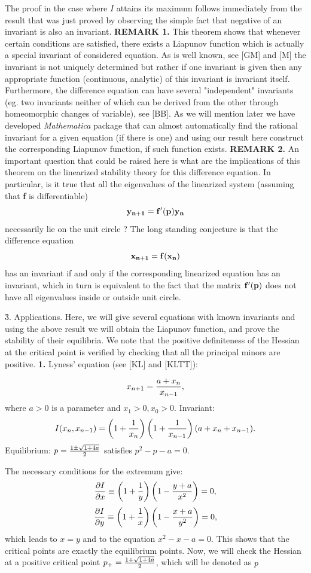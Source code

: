 The proof in the case where $I$ attains its maximum follows immediately from
the result that was just proved by observing the simple fact that negative of
an invariant is also an invariant.
\bigskip
{\bf REMARK 1.} This theorem shows that whenever certain
conditions are satisfied, there exists a Liapunov function which
is actually a special invariant of considered equation. As is well
known, see [GM] and [M] the invariant is not uniquely determined
but rather if one invariant is given then any appropriate function
(continuous, analytic) of this invariant is invariant itself.
Furthermore, the difference equation can have several
"independent" invariants (eg. two invariants neither of which can
be derived from the other through homeomorphic changes of
variable), see [BB]. As we will mention later we have developed
{\it Mathematica} package that can almost automatically find the
rational invariant for a given equation (if there is one) and
using our result here construct the corresponding Liapunov
function, if such function exists.
\medskip
{\bf REMARK 2.} An important question that could be raised here is
what are the implications of this theorem on the linearized
stability theory for this difference equation. In particular, is
it true that all the eigenvalues of the linearized system
(assuming that {\bf f} is differentiable) $${\bf y_{n+1}}={\bf
f'(p) y_n}$$ necessarily lie on the unit circle ? The long
standing conjecture is that the difference equation $${\bf
x_{n+1}}={\bf f( x_n)}$$ has an invariant if and only if the
corresponding linearized equation has an invariant, which in turn
is equivalent to the fact that the matrix ${\bf f'(p)}$ does not
have all eigenvalues inside or outside unit circle.


\bigskip
{\r 3. Applications.}
\bigskip
Here, we will give several equations with known invariants and using the above
result we will obtain the Liapunov function, and prove the stability of their
equilibria. We note that the positive definiteness of the Hessian at the critical
point is verified by checking that all the principal minors are positive.
\bigskip
{\bf 1.} Lyness' equation (see [KL] and [KLTT]):

$$x_{n+1}={{a + x_n}\over x_{n-1}},$$
where $a>0$ is a parameter and $x_1>0, x_0>0$.
Invariant:
$$I(x_n,x_{n-1})=\left(1+{1\over x_n}\right)\left(1+{1\over x_{n-1}}\right)(a+x_n+x_{n-1}).$$
Equilibrium: $p= {{1\pm \sqrt{1+4a}}\over 2}$ satisfies $p^2-p-a=0$.

The necessary conditions for the extremum give:
$${\partial I \over \partial x}\equiv \left(1+{1\over y}\right)\left(1-{{y+a}\over x^2}\right)=0,$$
$${\partial I \over \partial y}\equiv \left(1+{1\over x}\right)\left(1-{{x+a}\over y^2}\right)=0,$$
which leads to $x=y$ and to the equation $x^2-x-a=0$. This shows that the
critical points are exactly the equilibrium points. Now, we will check the Hessian
at a positive critical point $p_+= {{1+ \sqrt{1+4a}}\over 2}$, which will be
denoted as $p$

